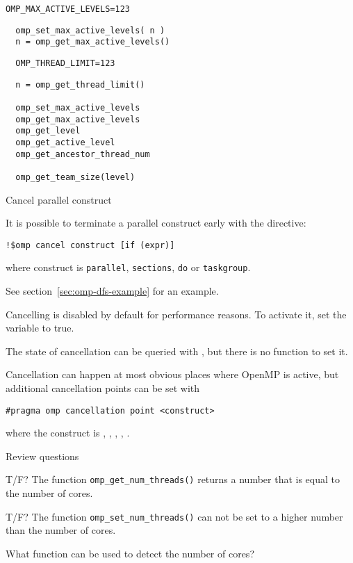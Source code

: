 \begin{verbatim}
OMP_MAX_ACTIVE_LEVELS=123
\end{verbatim}

\begin{lstlisting}
  omp_set_max_active_levels( n )
  n = omp_get_max_active_levels()
\end{lstlisting}

\begin{verbatim}
  OMP_THREAD_LIMIT=123
\end{verbatim}

\begin{lstlisting}
  n = omp_get_thread_limit()

  omp_set_max_active_levels
  omp_get_max_active_levels
  omp_get_level
  omp_get_active_level
  omp_get_ancestor_thread_num

  omp_get_team_size(level)
\end{lstlisting}


 {Cancel parallel construct}
\label{sec:omp-cancel}

It is possible to terminate a parallel construct early
with the  directive:
\begin{lstlisting}
!$omp cancel construct [if (expr)]
\end{lstlisting}
where construct is
\lstinline{parallel},
\lstinline{sections},
\lstinline{do}
or
\lstinline{taskgroup}.

See section~\ref{sec:omp-dfs-example} for an example.

Cancelling is disabled by default for performance reasons.
To activate it, set the  variable to true.

The state of cancellation can be queried with ,
but there is no function to set it.

Cancellation can happen at most obvious places where OpenMP is active,
but additional cancellation points can be set with 
\begin{lstlisting}
#pragma omp cancellation point <construct>
\end{lstlisting}
where the construct is , ,
, , .

 {Review questions}

\begin{exercise}
  T/F?
  The function \lstinline+omp_get_num_threads()+
  returns a number that is equal to the number of cores.
\end{exercise}

\begin{exercise}
  T/F?
  The function \lstinline+omp_set_num_threads()+
  can not be set to a higher number than the number of cores.
\end{exercise}

\begin{exercise}
  What function can be used to detect the number of cores? 
\end{exercise}

